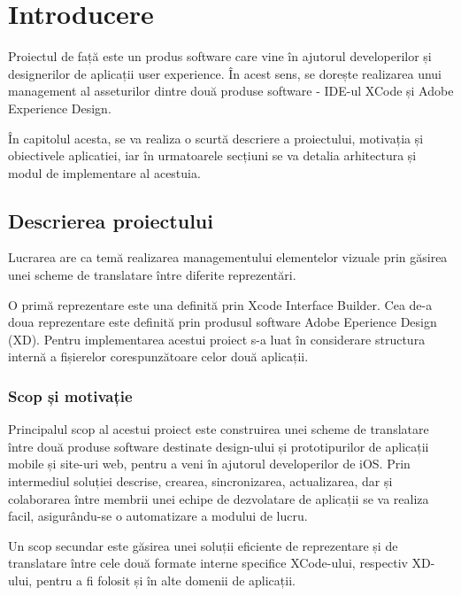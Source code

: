\chapter{Introducere}
\label{chapter:intro}

\par Proiectul de față este un produs software care vine în ajutorul developerilor și designerilor de aplicații user experience. În acest sens, se dorește realizarea unui management al asseturilor dintre două produse software - IDE-ul XCode și  Adobe Experience Design.
\par În capitolul acesta, se va realiza o scurtă descriere a proiectului, motivația și obiectivele aplicatiei, iar  în urmatoarele secțiuni se va detalia arhitectura și modul de implementare al acestuia.

\section{Descrierea proiectului}
\label{sec:proj}
\par Lucrarea are ca temă realizarea managementului elementelor vizuale prin găsirea unei scheme de translatare între diferite reprezentări.  
\par O primă reprezentare este una definită prin Xcode Interface Builder. Cea de-a doua reprezentare este definită prin produsul software Adobe Eperience Design (XD). 
Pentru implementarea acestui proiect s-a luat în considerare structura internă a fișierelor corespunzătoare celor două aplicații.



\subsection{Scop și motivație}
\label{sub-sec:proj-scope}
Principalul scop al acestui proiect este construirea unei scheme de translatare între două produse software destinate design-ului și prototipurilor de aplicații mobile și site-uri web, pentru a veni în ajutorul developerilor de iOS. Prin intermediul soluției descrise, crearea, sincronizarea, actualizarea, dar și colaborarea între membrii unei echipe de dezvolatare de aplicații se va realiza facil, asigurându-se o automatizare a modului de lucru.

Un scop secundar este găsirea unei soluții eficiente de reprezentare și de translatare între cele două formate interne specifice XCode-ului, respectiv XD-ului, pentru a fi folosit și în alte domenii de aplicații.

